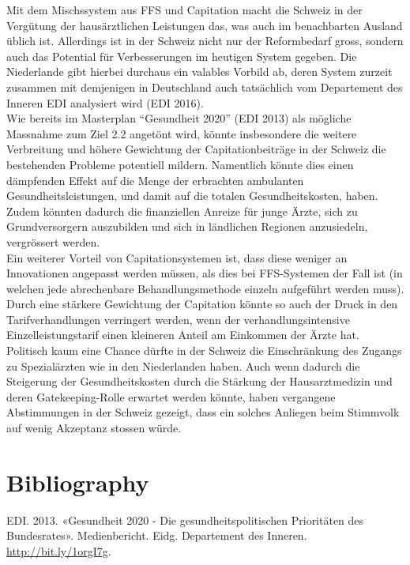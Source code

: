 \documentclass[ngerman,a4paper]{article}
\begin{document}
Mit dem Mischssystem aus FFS und Capitation macht die Schweiz in der
Vergütung der hausärztlichen Leistungen das, was auch im benachbarten
Ausland üblich ist. Allerdings ist in der Schweiz nicht nur der
Reformbedarf gross, sondern auch das Potential für Verbesserungen im
heutigen System gegeben. Die Niederlande gibt hierbei durchaus ein
valables Vorbild ab, deren System zurzeit zusammen mit demjenigen in
Deutschland auch tatsächlich vom Departement des Inneren EDI analysiert
wird (EDI 2016).\\
Wie bereits im Masterplan ``Gesundheit 2020'' (EDI 2013) als mögliche
Massnahme zum Ziel 2.2 angetönt wird, könnte insbesondere die weitere
Verbreitung und höhere Gewichtung der Capitationbeiträge in der Schweiz
die bestehenden Probleme potentiell mildern. Namentlich könnte dies
einen dämpfenden Effekt auf die Menge der erbrachten ambulanten
Gesundheitsleistungen, und damit auf die totalen Gesundheitskosten,
haben. Zudem könnten dadurch die finanziellen Anreize für junge Ärzte,
sich zu Grundversorgern auszubilden und sich in ländlichen Regionen
anzusiedeln, vergrössert werden.\\
Ein weiterer Vorteil von Capitationsystemen ist, dass diese weniger an
Innovationen angepasst werden müssen, als dies bei FFS-Systemen der Fall
ist (in welchen jede abrechenbare Behandlungsmethode einzeln aufgeführt
werden muss). Durch eine stärkere Gewichtung der Capitation könnte so
auch der Druck in den Tarifverhandlungen verringert werden, wenn der
verhandlungsintensive Einzelleistungstarif einen kleineren Anteil am
Einkommen der Ärzte hat.\\
Politisch kaum eine Chance dürfte in der Schweiz die Einschränkung des
Zugangs zu Spezialärzten wie in den Niederlanden haben. Auch wenn
dadurch die Steigerung der Gesundheitskosten durch die Stärkung der
Hausarztmedizin und deren Gatekeeping-Rolle erwartet werden könnte,
haben vergangene Abstimmungen in der Schweiz gezeigt, dass ein solches
Anliegen beim Stimmvolk auf wenig Akzeptanz stossen würde.

\section*{Bibliography}\label{bibliography}

\hypertarget{refs}{}
\hypertarget{ref-ediux5fgesundheitux5f2013}{}
EDI. 2013. «Gesundheit 2020 - Die gesundheitspolitischen Prioritäten des
Bundesrates». Medienbericht. Eidg. Departement des Inneren.
\url{http://bit.ly/1orgI7g}.
\end{document}
